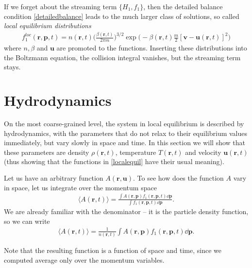 If we forget about the streaming term $\big\{ H_1, f_1 \big\}$, then the detailed balance condition \ref{detailedbalance} leads to the much larger class of solutions, so called \textit{local equilibrium distributions}
\begin{align} \label{localequil}
f_1^{loc}(\bm{r},\bm{p},t) = n(\bm{r},t) \Big(\frac{\beta(\bm{r},t)}{2\pi m}\Big)^{3/2} \exp \big(-\beta(\bm{r},t)\frac{m}{2}[\bm{v} - \bm{u}(\bm{r},t)]^2 \big)
\end{align}
where $n,\beta$ and $\bm{u}$ are promoted to the functions.
Inserting these distributions into the Boltzmann equation, the collision integral vanishes, but the streaming term stays.

\section{Hydrodynamics}
On the most coarse-grained level, the system in local equilibrium is described by hydrodynamics, with the parameters that do not relax to their equilibrium values immediately, but vary slowly in space and time.
In this section we will show that these parameters are density $\rho(\bm{r},t)$, temperature $T(\bm{r},t)$ and velocity $\bm{u}(\bm{r},t)$ (thus showing that the functions in \ref{localequil} have their usual meaning).

Let us have an arbitrary function $A(\bm{r},\bm{u})$.
To see how does the function $A$ vary in space, let us integrate over the momentum space
\begin{align} \label{averg}
\langle A(\bm{r},t) \rangle = \frac{\int A(\bm{r},\bm{p}) f_1(\bm{r},\bm{p},t) \dd \bm{p}}{\int f_1(\bm{r},\bm{p},t) \dd \bm{p}}.
\end{align}
We are already familiar with the denominator -- it is the particle density function, so we can write
\begin{align*}
\langle A(\bm{r},t) \rangle = \frac{1}{n(\bm{r},t)} \int A(\bm{r},\bm{p}) f_1(\bm{r},\bm{p},t) \dd \bm{p}.
\end{align*} 

Note that the resulting function is a function of space and time, since we computed average only over the momentum variables.

